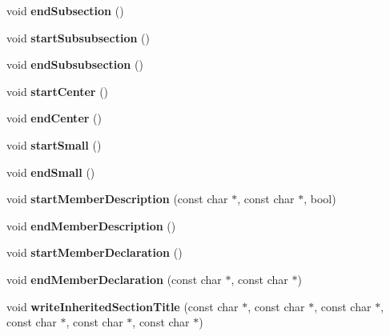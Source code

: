 \begin{DoxyCompactItemize}
void {\bfseries end\+Subsection} ()
\item 
\mbox{\label{class_man_generator_aedb1d92ae73f0d14dceac0f52eb159d1}} 
void {\bfseries start\+Subsubsection} ()
\item 
\mbox{\label{class_man_generator_ab4ab218011dee86fa1e5f7938567aefb}} 
void {\bfseries end\+Subsubsection} ()
\item 
\mbox{\label{class_man_generator_a0779e3309c5b48fef8be36d066e51879}} 
void {\bfseries start\+Center} ()
\item 
\mbox{\label{class_man_generator_ac97abbbcd519a1c77f62516634feff3f}} 
void {\bfseries end\+Center} ()
\item 
\mbox{\label{class_man_generator_a5a3d0de8665d88ae599c1d3d408356d3}} 
void {\bfseries start\+Small} ()
\item 
\mbox{\label{class_man_generator_a1e934fe458d046107d45ab389ea645d8}} 
void {\bfseries end\+Small} ()
\item 
\mbox{\label{class_man_generator_a198a1264b3c2d5f1e45c71ea3b82be9c}} 
void {\bfseries start\+Member\+Description} (const char $\ast$, const char $\ast$, bool)
\item 
\mbox{\label{class_man_generator_a79c75e33f0931c60403f1f8c17f12808}} 
void {\bfseries end\+Member\+Description} ()
\item 
\mbox{\label{class_man_generator_a19e8526336e7686234452bfe36420858}} 
void {\bfseries start\+Member\+Declaration} ()
\item 
\mbox{\label{class_man_generator_a99c9249b28b3ec0a01bc379abca51448}} 
void {\bfseries end\+Member\+Declaration} (const char $\ast$, const char $\ast$)
\item 
\mbox{\label{class_man_generator_a69751a9ead6f0704b5656143c137877d}} 
void {\bfseries write\+Inherited\+Section\+Title} (const char $\ast$, const char $\ast$, const char $\ast$, const char $\ast$, const char $\ast$, const char $\ast$)

\end{DoxyCompactItemize}
